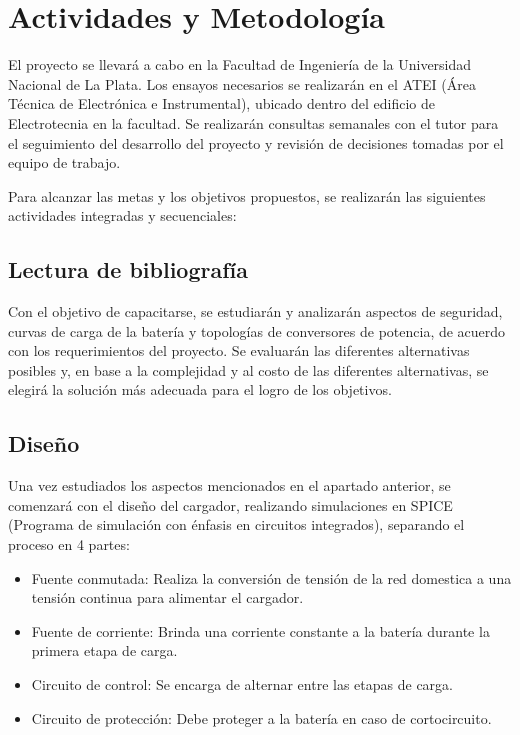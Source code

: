 \section{Actividades y Metodología}


El proyecto se llevará a cabo en la Facultad de Ingeniería de la Universidad Nacional de La Plata.
Los ensayos necesarios se realizarán en el ATEI (Área Técnica de Electrónica e Instrumental),
ubicado dentro del edificio de Electrotecnia en la facultad.
Se realizarán consultas semanales con el tutor para el seguimiento del desarrollo del proyecto y
revisión de decisiones tomadas por el equipo de trabajo.

Para alcanzar las metas y los objetivos propuestos, se realizarán las siguientes actividades integradas y secuenciales:

\subsection{Lectura de bibliografía}
Con el objetivo de capacitarse, se estudiarán y analizarán aspectos de seguridad, curvas de carga de la batería 
y topologías de conversores de potencia, de acuerdo con los requerimientos del proyecto. 
Se evaluarán las diferentes alternativas posibles y,
en base a la complejidad y al costo de las diferentes alternativas,
se elegirá la solución más adecuada para el logro de los objetivos. 

\subsection{Diseño}
Una vez estudiados los aspectos mencionados en el apartado anterior,
se comenzará con el diseño del cargador,
realizando simulaciones en SPICE (Programa de simulación con énfasis en circuitos integrados),
separando el proceso en 4 partes:
\begin{itemize}
    \item Fuente conmutada: Realiza la conversión de tensión de la red domestica a una tensión continua para alimentar el cargador.
    \item Fuente de corriente: Brinda una corriente constante a la batería durante la primera etapa de carga.
    \item Circuito de control: Se encarga de alternar entre las etapas de carga.
    \item Circuito de protección: Debe proteger a la batería en caso de cortocircuito.
\end{itemize}

